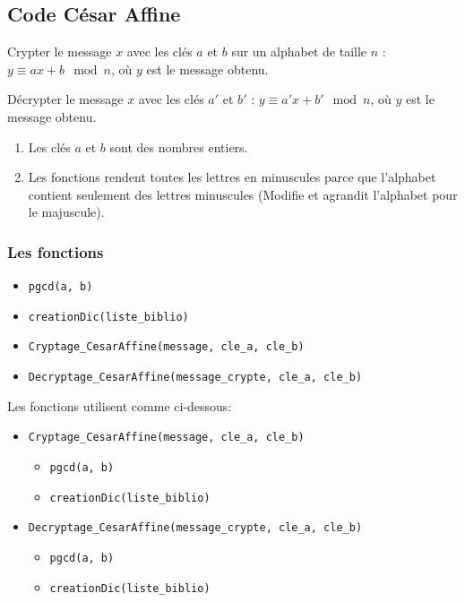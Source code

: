 \documentclass{article}
\begin{document}
\subsection{Code César Affine}
Crypter le message \(x\) avec les clés \(a\) et \(b\) sur un alphabet de taille \(n\) : \(y \equiv ax + b \mod n\), où \(y\) est le message obtenu.

Décrypter le message \(x\) avec les clés \(a'\) et \(b'\) : \(y \equiv a'x + b' \mod n\), où \(y\) est le message obtenu.

\begin{enumerate}
    \item Les clés \(a\) et \(b\) sont des nombres entiers.
    \item Les fonctions rendent toutes les lettres en minuscules parce que l'alphabet contient seulement des lettres minuscules (Modifie et agrandit l'alphabet pour le majuscule).
\end{enumerate}

\subsubsection{Les fonctions}
\begin{itemize}
    \item \texttt{pgcd(a, b)}
    \item \texttt{creationDic(liste\_biblio)}
    \item \texttt{Cryptage\_CesarAffine(message, cle\_a, cle\_b)}
    \item \texttt{Decryptage\_CesarAffine(message\_crypte, cle\_a, cle\_b)}
\end{itemize}

\leavevmode
\newline

Les fonctions utilisent comme ci-dessous:

\begin{itemize}
    \item \texttt{Cryptage\_CesarAffine(message, cle\_a, cle\_b)}
        \begin{itemize}
        \item \texttt{pgcd(a, b)}
        \item \texttt{creationDic(liste\_biblio)}
        \end{itemize}                    
    \item \texttt{Decryptage\_CesarAffine(message\_crypte, cle\_a, cle\_b)}
        \begin{itemize}
        \item \texttt{pgcd(a, b)}
        \item \texttt{creationDic(liste\_biblio)}
        \end{itemize}                
\end{itemize}
\newpage
\end{document}
